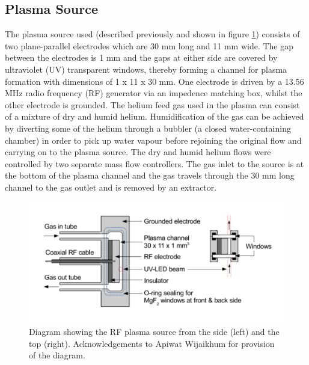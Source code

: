 \documentclass[11pt, oneside]{article}   	%
\begin{document}
\subsection{Plasma Source}
The plasma source used (described previously \cite{Niemi2013} and shown in figure \ref{fig:PlasmaSource}) consists of two plane-parallel electrodes which are 30 mm long and 11 mm wide. 
The gap between the electrodes is 1 mm and the gaps at either side are covered by ultraviolet (UV) transparent windows, thereby forming a channel for plasma formation with dimensions of 1 x 11 x 30 mm.
One electrode is driven by a 13.56 MHz radio frequency (RF) generator via an impedence matching box, whilst the other electrode is grounded. 
The helium feed gas used in the plasma can consist of a mixture of dry and humid helium. Humidification of the gas can be achieved by diverting some of the helium through a bubbler (a closed water-containing chamber) in order to pick up water vapour before rejoining the original flow and carrying on to the plasma source.
The dry and humid helium flows were controlled by two separate mass flow controllers.
The gas inlet to the source is at the bottom of the plasma channel and the gas travels through the 30 mm long channel to the gas outlet and is removed by an extractor.

\begin{figure}
	\includegraphics[width=\textwidth]{Figures/PlasmafromApiwat}
	\caption{Diagram showing the RF plasma source from the side (left) and the top (right). Acknowledgements to Apiwat Wijaikhum for provision of the diagram.}
	\label{fig:PlasmaSource}
\end{figure}





\end{document}
